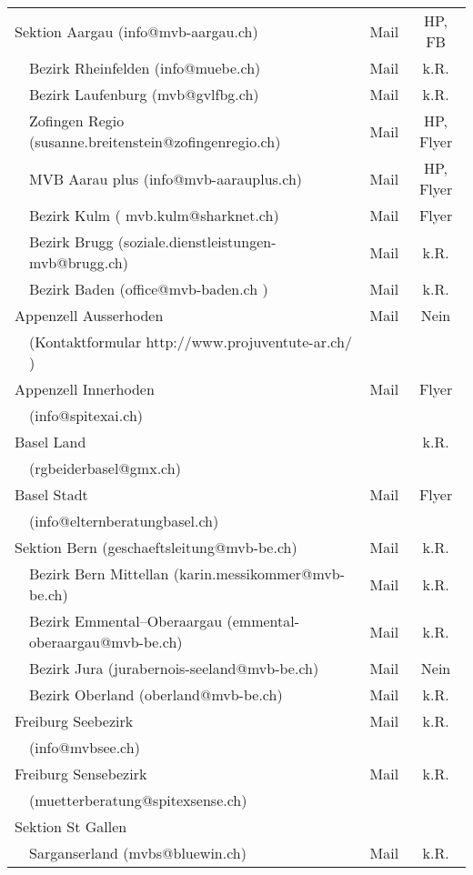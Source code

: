 \begin{longtable}[htbp]{|p{0.2em} p{20em} | c | c |}
  
  \multicolumn{2}{|l|}{Sektion Aargau (info@mvb-aargau.ch)} & Mail & HP, FB\\
  & Bezirk Rheinfelden (info@muebe.ch) & Mail & k.R.\\
  & Bezirk Laufenburg (mvb@gvlfbg.ch) & Mail & k.R.\\
  & Zofingen Regio (susanne.breitenstein@zofingenregio.ch) & Mail & HP, Flyer \\
  & MVB Aarau plus (info@mvb-aarauplus.ch) & Mail & HP, Flyer \\
  & Bezirk Kulm ( mvb.kulm@sharknet.ch) & Mail & Flyer\\
  & Bezirk Brugg (soziale.dienstleistungen-mvb@brugg.ch) & Mail & k.R.\\
  & Bezirk Baden (office@mvb-baden.ch ) & Mail & k.R. \\
   \multicolumn{2}{|l|}{Appenzell Ausserhoden } & Mail & Nein\\
  & (Kontaktformular http://www.projuventute-ar.ch/ ) & & \\
  \multicolumn{2}{|l|}{Appenzell Innerhoden } & Mail & Flyer\\
  & (info@spitexai.ch) & & \\
  \multicolumn{2}{|l|}{Basel Land} & & k.R.\\
  & (rgbeiderbasel@gmx.ch) & & \\
  \multicolumn{2}{|l|}{Basel Stadt} & Mail & Flyer\\
  & (info@elternberatungbasel.ch) & & \\
  \multicolumn{2}{|l|}{Sektion Bern (geschaeftsleitung@mvb-be.ch)} & Mail & k.R.\\
  & Bezirk Bern Mittellan (karin.messikommer@mvb-be.ch) & Mail & k.R. \\
  & Bezirk Emmental–Oberaargau (emmental-oberaargau@mvb-be.ch) & Mail & k.R. \\
  & Bezirk Jura (jurabernois-seeland@mvb-be.ch) & Mail & Nein \\
  & Bezirk Oberland (oberland@mvb-be.ch) & Mail & k.R. \\
  \multicolumn{2}{|l|}{Freiburg Seebezirk} & Mail & k.R.\\
  & (info@mvbsee.ch) & & \\
  \multicolumn{2}{|l|}{Freiburg Sensebezirk} & Mail & k.R.\\
  & (muetterberatung@spitexsense.ch) & & \\
  \multicolumn{2}{|l|}{Sektion St Gallen} &  & \\
  & Sarganserland (mvbs@bluewin.ch) & Mail & k.R.\\

\end{longtable}
